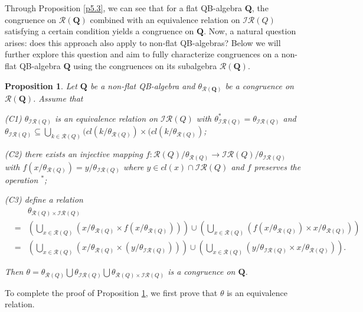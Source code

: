 \documentclass[12pt]{amsart}
\newtheorem{proposition}{Proposition}[section]
\theoremstyle{definition}
\theoremstyle{remark}
\numberwithin{equation}{section}
\begin{document}
Through Proposition \ref{p5.3}, we can see that for a flat QB-algebra $\mathbf{Q}$, the congruence on $\mathscr{R}(\mathbf{Q})$ combined with an equivalence relation on $\mathscr{IR}(Q)$ satisfying a certain condition yields a congruence on $\mathbf{Q}$. Now, a natural question arises: does this approach also apply to non-flat QB-algebras? Below we will further explore this question and aim to fully characterize congruences on a non-flat QB-algebra $\mathbf{Q}$ using the congruences on its subalgebra $\mathscr{R}(\mathbf{Q})$.



\begin{proposition}\label{break}
Let $\mathbf{Q}$ be a non-flat QB-algebra and $\theta_{\mathscr{R}(\mathbf{Q})}$ be a congruence on $\mathscr{R}(\mathbf{Q})$. Assume that

\emph{(C1)} $\theta_{\mathscr{IR}(Q)}$ is an equivalence relation on $\mathscr{IR}(Q)$ with $\theta_{\mathscr{IR}(Q)}^{\ast}=\theta_{\mathscr{IR}(Q)}$ and $\theta_{\mathscr{IR}(Q)} \subseteq \bigcup_{k\in \mathscr{R}({Q})}(cl(k/\theta_{\mathscr{R}(Q)})\times (cl(k/\theta_{\mathscr{R}(Q)})$;

\emph{(C2)} there exists an injective mapping $f: \mathscr{R}(Q)/\theta_{\mathscr{R}(Q)}\rightarrow \mathscr{IR}(Q)/\theta_{\mathscr{IR}(Q)}$ with $f(x/\theta_{\mathscr{R}(Q)})=y/\theta_{\mathscr{IR}(Q)}$ where $y\in cl(x)\cap \mathscr{IR} (Q)$ and $f$ preserves the operation $^{\ast}$;


\emph{(C3)} define a relation
\begin{eqnarray*}
&&\theta_{\mathscr{R}(Q)\times \mathscr{IR}(Q)}  \\
  &=&(\bigcup_{x\in \mathscr{R}(Q)}(x/\theta_{\mathscr{R}(Q)}\times f(x/\theta_{\mathscr{R}(Q)})))\cup (\bigcup_{x\in \mathscr{R}(Q)}(f(x/\theta_{\mathscr{R}(Q)}) \times x/\theta_{\mathscr{R}(Q)} ))  \\
  &=& (\bigcup_{x\in \mathscr{R}(Q)}(x/\theta_{\mathscr{R}(Q)}\times (y/\theta_{\mathscr{IR}(Q)})))\cup (\bigcup_{x\in \mathscr{R}(Q)}(y/\theta_{\mathscr{IR}(Q)} \times x/\theta_{\mathscr{R}(Q)})).
\end{eqnarray*}

Then $\theta=\theta_{\mathscr{R}(Q)}\bigcup \theta_{\mathscr{IR}(Q)} \bigcup \theta_{\mathscr{R}(Q)\times \mathscr{IR}(Q)}$ is a congruence on $\mathbf{Q}$.
\end{proposition}

To complete the proof of Proposition \ref{break},  we first prove that $\theta$ is an equivalence relation.
\end{document}
